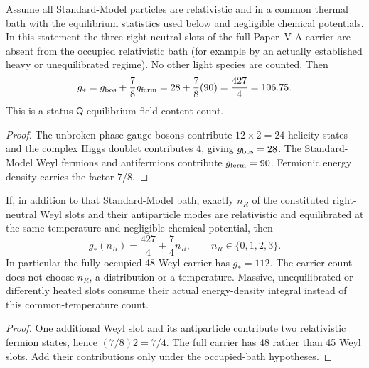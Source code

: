 \documentclass[12pt,a4paper]{article}
\begin{document}
\begin{proposition}
\label{p7v2:prop:gstar}
Assume all Standard-Model particles are relativistic and in a common thermal
bath with the equilibrium statistics used below and negligible chemical
potentials.  In this statement the three right-neutral slots of the full
Paper--V-A carrier are absent from the occupied relativistic bath (for
example by an actually established heavy or unequilibrated regime).
No other light species are counted.  Then
\begin{equation}
\label{p7v2:eq:gstar}
 g_*=
 g_{\rm bos}+\frac78g_{\rm ferm}
 =
 28+\frac78(90)
 =
 \frac{427}{4}
 =
 106.75.
\end{equation}
This is a status-\(\mathsf Q\) equilibrium field-content count.
\end{proposition}

\begin{proof}
The unbroken-phase gauge bosons contribute \(12\times2=24\) helicity states and
the complex Higgs doublet contributes \(4\), giving \(g_{\rm bos}=28\).
The Standard-Model Weyl fermions and antifermions contribute
\(g_{\rm ferm}=90\).  Fermionic energy density carries the factor \(7/8\).
\end{proof}

\begin{corollary}
\label{p7:cor:v2211-right-neutral-bath-count}
If, in addition to that Standard-Model bath, exactly \(n_R\) of the
constituted right-neutral Weyl slots and their antiparticle modes are
relativistic and equilibrated at the same temperature and negligible
chemical potential, then
\[
 \boxed{g_*(n_R)=\frac{427}{4}+\frac74n_R,
 \qquad n_R\in\{0,1,2,3\}.}
\]
In particular the fully occupied 48-Weyl carrier has \(g_*=112\).
The carrier count does not choose \(n_R\), a distribution or a temperature.
Massive, unequilibrated or differently heated slots consume their actual
energy-density integral instead of this common-temperature count.
\end{corollary}
\begin{proof}
One additional Weyl slot and its antiparticle contribute two relativistic
fermion states, hence \((7/8)2=7/4\).  The full carrier has 48 rather
than 45 Weyl slots.  Add their contributions only under the occupied-bath
hypotheses.
\end{proof}
\end{document}
